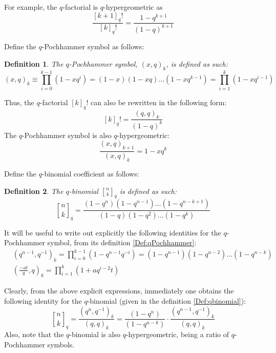 \documentclass[a4paper,titlepage,twoside]{book}
\newtheorem{definition}{Definition}
\begin{document}
For example, the $q$-factorial is $q$-hypergeometric as 
\[
\frac{ [k+1]_q! }{ [k]_q!} = \frac{1-q^{k+1}}{  (1-q)^{k+1}}
\]

Define the $q$-Pochhammer symbol as follows:
\begin{definition}
  The $q$-Pochhammer symbol, $(x,q)_k$, is defined as such:
  \begin{equation}
    (x,q)_k \equiv \prod_{i=0}^{k-1} (1-xq^i) = (1-x)(1-xq) \dots ( 1-xq^{k-1}) = \prod_{i=1}^{k} (1-xq^{i-1})   \label{Def:qPochhammer}
  \end{equation}
\end{definition}
Thus, the $q$-factorial $[k]_q!$ can also be rewritten in the following form:
\[
[k]_q! = \frac{ (q,q)_k}{ ( 1-  q)^k}
\]
The $q$-Pochhammer symbol is also $q$-hypergeometric:
\[
\frac{(x,q)_{k+1}}{ (x,q)_k} = 1 - xq^k
\]

Define the $q$-binomial coefficient as follows:
\begin{definition}
  The $q$-binomial ${ n \brack k }_q$ is defined as such:
\begin{equation}
  { n \brack k }_q = \frac{ (1- q^n) ( 1 - q^{n-1} ) \dots ( 1 - q^{ n- k + 1 }  ) }{ (1- q) ( 1 - q^2 ) \dots ( 1- q^k ) }  \label{Def:qbinomial}
\end{equation} 
\end{definition}

It will be useful to write out explicitly the following identities for the $q$-Pochhammer symbol, from its definition \ref{Def:qPochhammer}:
\begin{equation}
\begin{aligned}
  & (q^{n-1}, q^{-1})_k = \prod_{i=0}^{k-1} ( 1 - q^{n-1} q^{-i} ) = (1-q^{n-1} )(1 - q^{n-2}) \dots ( 1 - q^{n-k} ) \\ 
  & \left( \frac{-at}{q}, q \right)_k = \prod_{i=1}^k ( 1 + aq^{i-2}t )
\end{aligned}  \label{Eq:qPochhammerbasic00}
\end{equation}

Clearly, from the above explicit expressions, immediately one obtains the following identity for the $q$-binomial (given in the definition \ref{Def:qbinomial}):
\begin{equation}
  { n \brack k }_q = \frac{ (q^n, q^{-1})_k }{ (q,q)_k}  = \frac{ ( 1 - q^n ) }{ ( 1 - q^{n-k} ) } \cdot  \frac{  (q^{n-1}, q^{-1})_k }{ (q,q)_k } 
\end{equation}
Also, note that the $q$-binomial is also $q$-hypergeometric, being a ratio of $q$-Pochhammer symbols.  
\end{document}
